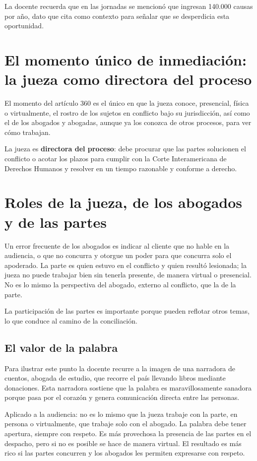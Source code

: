 \documentclass[12pt,oneside]{book}
\begin{document}
La docente recuerda que en las jornadas se mencionó que ingresan 140.000 causas por año, dato que cita como contexto para señalar que se desperdicia esta oportunidad.

\section{El momento único de inmediación: la jueza como directora del proceso}

El momento del artículo 360 es el único en que la jueza conoce, presencial, física o virtualmente, el rostro de los sujetos en conflicto bajo su jurisdicción, así como el de los abogados y abogadas, aunque ya los conozca de otros procesos, para ver cómo trabajan.

La jueza es \textbf{directora del proceso}: debe procurar que las partes solucionen el conflicto o acotar los plazos para cumplir con la Corte Interamericana de Derechos Humanos y resolver en un tiempo razonable y conforme a derecho.

\section{Roles de la jueza, de los abogados y de las partes}

Un error frecuente de los abogados es indicar al cliente que no hable en la audiencia, o que no concurra y otorgue un poder para que concurra solo el apoderado. La parte es quien estuvo en el conflicto y quien resultó lesionada; la jueza no puede trabajar bien sin tenerla presente, de manera virtual o presencial. No es lo mismo la perspectiva del abogado, externo al conflicto, que la de la parte.

La participación de las partes es importante porque pueden reflotar otros temas, lo que conduce al camino de la conciliación.

\subsection{El valor de la palabra}

Para ilustrar este punto la docente recurre a la imagen de una narradora de cuentos, abogada de estudio, que recorre el país llevando libros mediante donaciones. Esta narradora sostiene que la palabra es maravillosamente sanadora porque pasa por el corazón y genera comunicación directa entre las personas.

Aplicado a la audiencia: no es lo mismo que la jueza trabaje con la parte, en persona o virtualmente, que trabaje solo con el abogado. La palabra debe tener apertura, siempre con respeto. Es más provechosa la presencia de las partes en el despacho, pero si no es posible se hace de manera virtual. El resultado es más rico si las partes concurren y los abogados les permiten expresarse con respeto.
\end{document}
